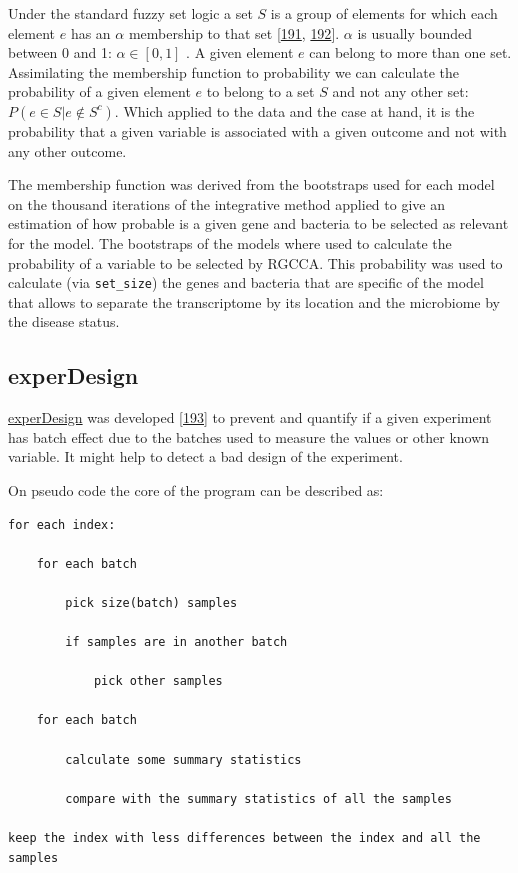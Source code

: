 \documentclass[
  12pt,
  a4paper,
  twoside,
  openright]{book}
\begin{document}
Under the standard fuzzy set logic a set \(S\) is a group of elements for which each element \(e\) has an \(\alpha\) membership to that set {[}\protect\hyperlink{ref-filzmoser2004}{191}, \protect\hyperlink{ref-dubois1993}{192}{]}.
\(\alpha\) is usually bounded between 0 and 1: \(\alpha \in [0, 1]\) .
A given element \(e\) can belong to more than one set.
Assimilating the membership function to probability we can calculate the probability of a given element \(e\) to belong to a set \(S\) and not any other set: \(P(e \in S|e \not \in S^c)\).
Which applied to the data and the case at hand, it is the probability that a given variable is associated with a given outcome and not with any other outcome.

The membership function was derived from the bootstraps used for each model on the thousand iterations of the integrative method applied to give an estimation of how probable is a given gene and bacteria to be selected as relevant for the model.
The bootstraps of the models where used to calculate the probability of a variable to be selected by RGCCA.
This probability was used to calculate (via \texttt{set\_size}) the genes and bacteria that are specific of the model that allows to separate the transcriptome by its location and the microbiome by the disease status.

\hypertarget{experdesign}{%
\subsection{experDesign}\label{experdesign}}

\href{https://cran.r-project.org/package=experDesign}{experDesign} was developed {[}\protect\hyperlink{ref-revillasancho2021}{193}{]} to prevent and quantify if a given experiment has batch effect due to the batches used to measure the values or other known variable.
It might help to detect a bad design of the experiment.

On pseudo code the core of the program can be described as:

\hypertarget{pseudocode-experDesign}{%
\label{pseudocode-experDesign}}%
\begin{verbatim}
for each index:

    for each batch

        pick size(batch) samples

        if samples are in another batch

            pick other samples

    for each batch

        calculate some summary statistics

        compare with the summary statistics of all the samples

keep the index with less differences between the index and all the samples
\end{verbatim}
\end{document}
